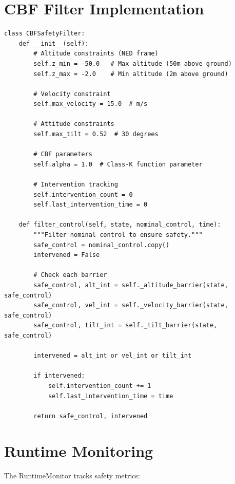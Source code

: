 \section{CBF Filter Implementation}

\begin{lstlisting}[caption={CBFSafetyFilter class structure}]
class CBFSafetyFilter:
    def __init__(self):
        # Altitude constraints (NED frame)
        self.z_min = -50.0   # Max altitude (50m above ground)
        self.z_max = -2.0    # Min altitude (2m above ground)

        # Velocity constraint
        self.max_velocity = 15.0  # m/s

        # Attitude constraints
        self.max_tilt = 0.52  # 30 degrees

        # CBF parameters
        self.alpha = 1.0  # Class-K function parameter

        # Intervention tracking
        self.intervention_count = 0
        self.last_intervention_time = 0

    def filter_control(self, state, nominal_control, time):
        """Filter nominal control to ensure safety."""
        safe_control = nominal_control.copy()
        intervened = False

        # Check each barrier
        safe_control, alt_int = self._altitude_barrier(state, safe_control)
        safe_control, vel_int = self._velocity_barrier(state, safe_control)
        safe_control, tilt_int = self._tilt_barrier(state, safe_control)

        intervened = alt_int or vel_int or tilt_int

        if intervened:
            self.intervention_count += 1
            self.last_intervention_time = time

        return safe_control, intervened
\end{lstlisting}

\section{Runtime Monitoring}

The RuntimeMonitor tracks safety metrics:

